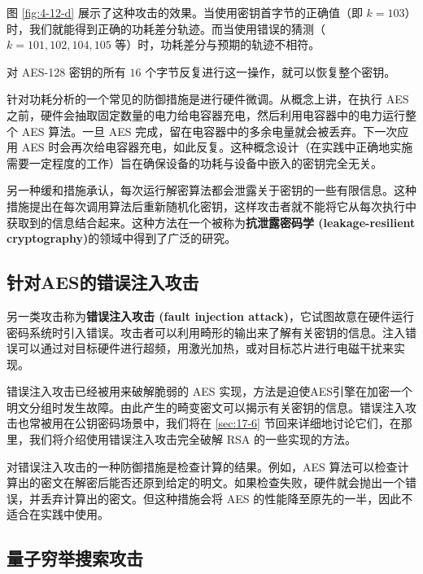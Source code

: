 \begin{snote}[差分功耗分析。]
\vspace*{5pt}

\noindent
图 \ref{fig:4-12-d} 展示了这种攻击的效果。当使用密钥首字节的正确值（即 $k=103$）时，我们就能得到正确的功耗差分轨迹。而当使用错误的猜测（$k=101,102,104,105$ 等）时，功耗差分与预期的轨迹不相符。

对 AES-128 密钥的所有 $16$ 个字节反复进行这一操作，就可以恢复整个密钥。
\end{snote}

\begin{snote}[缓和措施。]
针对功耗分析的一个常见的防御措施是进行硬件微调。从概念上讲，在执行 AES 之前，硬件会抽取固定数量的电力给电容器充电，然后利用电容器中的电力运行整个 AES 算法。一旦 AES 完成，留在电容器中的多余电量就会被丢弃。下一次应用 AES 时会再次给电容器充电，如此反复。这种概念设计（在实践中正确地实施需要一定程度的工作）旨在确保设备的功耗与设备中嵌入的密钥完全无关。

另一种缓和措施承认，每次运行解密算法都会泄露关于密钥的一些有限信息。这种措施提出在每次调用算法后重新随机化密钥，这样攻击者就不能将它从每次执行中获取到的信息结合起来。这种方法在一个被称为\textbf{抗泄露密码学 (leakage-resilient cryptography)}的领域中得到了广泛的研究。
\end{snote}

\subsection{针对AES的错误注入攻击}\label{subsec:4-3-3}

另一类攻击称为\textbf{错误注入攻击 (fault injection attack)}，它试图故意在硬件运行密码系统时引入错误。攻击者可以利用畸形的输出来了解有关密钥的信息。注入错误可以通过对目标硬件进行超频，用激光加热，或对目标芯片进行电磁干扰来实现。

错误注入攻击已经被用来破解脆弱的 AES 实现，方法是迫使AES引擎在加密一个明文分组时发生故障。由此产生的畸变密文可以揭示有关密钥的信息。错误注入攻击也常被用在公钥密码场景中，我们将在 \ref{sec:17-6} 节回来详细地讨论它们，在那里，我们将介绍使用错误注入攻击完全破解 RSA 的一些实现的方法。

对错误注入攻击的一种防御措施是检查计算的结果。例如，AES 算法可以检查计算出的密文在解密后能否还原到给定的明文。如果检查失败，硬件就会抛出一个错误，并丢弃计算出的密文。但这种措施会将 AES 的性能降至原先的一半，因此不适合在实践中使用。

\subsection{量子穷举搜索攻击}\label{subsec:4-3-4}

